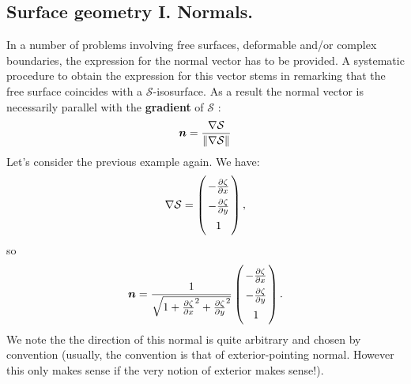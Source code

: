 \subsection{Surface geometry I. Normals.} In a number of problems involving free surfaces, deformable and/or complex boundaries, the expression for the normal vector has to be provided. A systematic procedure to obtain the expression for this vector stems in remarking that the free surface coincides with a $\mathcal S$-isosurface. As a result the normal vector is necessarily parallel with the \textbf{gradient} of $\mathcal S$ :
\begin{equation}
\bn = \frac{\nabla \matS}{\|\nabla \matS\|}
\end{equation}
 Let's consider the previous example again. We have:
$$
\nabla \matS = \lp
\arraycolsep=1.4pt\def\arraystretch{1.5}
\begin{array}{c}
-\pd{\zeta}{x}\\
-\pd{\zeta}{y}\\
1
\end{array}
\rp,
$$
so
\begin{equation}
\bn = \frac{1}{\sqrt{1+\pd{\zeta}{x}^2+\pd{\zeta}{y}^2}}\lp
\arraycolsep=1.4pt\def\arraystretch{1.5}
\begin{array}{c}
-\pd{\zeta}{x}\\
-\pd{\zeta}{y}\\
1
\end{array}
\rp.
\label{eq:wave_normal}
\end{equation}
We note the the direction of this normal is quite arbitrary and chosen by convention (usually, the convention is that of exterior-pointing normal. However this only makes sense if the very notion of exterior makes sense!).

